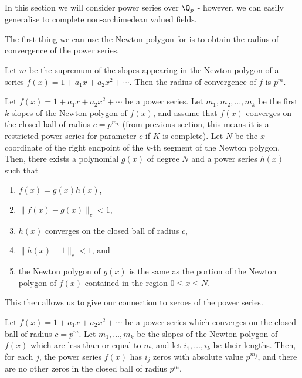 In this section we will consider power series over $\Q_p$ - however, we can easily generalise to
complete non-archimedean valued fields.

The first thing we can use the Newton polygon for is to obtain the radius of convergence of the
power series.

\begin{theorem} \label{RadofCon}
    Let $m$ be the supremum of the slopes appearing in the Newton polygon of a series
    $f(x) = 1 + a_1 x + a_2 x^2 + \cdots$. Then the radius of convergence of $f$ is $p^m.$
\end{theorem}

\begin{proposition}\label{NP}
    Let $f(x) = 1 + a_1 x + a_2 x^2 + \cdots$ be a power series. Let $m_1, m_2, \dots, m_k$ be the
    first $k$ slopes of the Newton polygon of $f(x)$, and assume that $f(x)$ converges on the
    closed ball of radius $c = p^{m_k}$ (from previous section, this means it is a restricted power
    series for parameter $c$ if $K$ is complete). Let $N$ be the $x$-coordinate of the right
    endpoint of the $k$-th segment of the Newton polygon. Then, there exists a polynomial
    $g(x)$ of degree $N$ and a power series $h(x)$ such that
    \begin{enumerate}
        \item $f(x) = g(x) h(x)$,
        \item $\| f(x) - g(x) \|_c < 1$,
        \item $h(x)$ converges on the closed ball of radius $c$,
        \item $\| h(x) - 1\|_c <1$, and
        \item the Newton polygon of $g(x)$ is the same as the portion of the Newton polygon of
        $f(x)$ contained in the region $0 \leq x \leq N$.
    \end{enumerate}
\end{proposition}

This then allows us to give our connection to zeroes of the power series.

\begin{corollary}
    Let $f(x) = 1 + a_1 x + a_2 x^2 + \cdots$ be a power series which converges on the closed ball
    of radius $c = p^m$. Let $m_1,\dots, m_k$ be the slopes of the Newton polygon of $f(x)$ which
    are less than or equal to $m$, and let $i_1,\dots,i_k$ be their lengths. Then, for each $j$, the
    power series $f(x)$ has $i_j$ zeros with absolute value $p^{m_j}$, and there are no other zeros
    in the closed ball of radius $p^m.$
\end{corollary}

